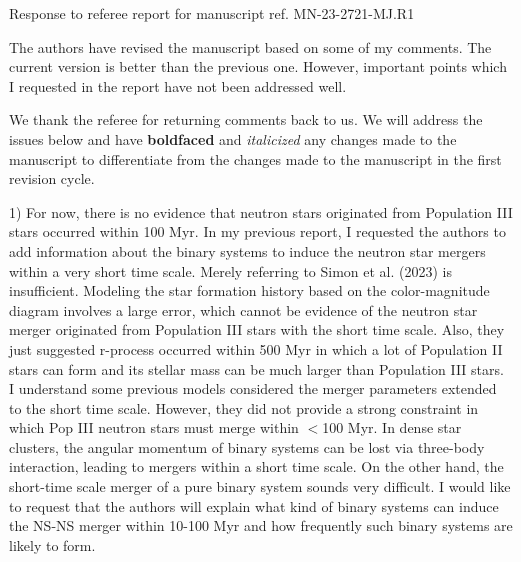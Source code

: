 \documentclass[11pt]{article}
\begin{document}
\begin{center} 
\bfseries{
\begin{large}
  Response to referee report for manuscript ref. MN-23-2721-MJ.R1
\end{large}
}
\end{center}

\begin{tcolorbox}[colback={lightgray}]
The authors have revised the manuscript based on some of my comments. The current version is better than the previous one. However, important points which I requested in the report have not been addressed well.
\end{tcolorbox}

We thank the referee for returning comments back to us. We will address the issues below and have \textbf{boldfaced} and \textit{italicized} any changes made to the manuscript to differentiate from the changes made to the manuscript in the first revision cycle.

\begin{tcolorbox}[colback={lightgray}]
1) For now, there is no evidence that neutron stars originated from Population III stars occurred within 100 Myr. In my previous report, I requested the authors to add information about the binary systems to induce the neutron star mergers within a very short time scale. Merely referring to Simon et al. (2023) is insufficient. Modeling the star formation history based on the color-magnitude diagram involves a large error, which cannot be evidence of the neutron star merger originated from Population III stars with the short time scale. Also, they just suggested r-process occurred within 500 Myr in which a lot of Population II stars can form and its stellar mass can be much larger than Population III stars. I understand some previous models considered the merger parameters extended to the short time scale. However, they did not provide a strong constraint in which Pop III neutron stars must merge within $<$100 Myr. In dense star clusters, the angular momentum of binary systems can be lost via three-body interaction, leading to mergers within a short time scale. On the other hand, the short-time scale merger of a pure binary system sounds very difficult. I would like to request that the authors will explain what kind of binary systems can induce the NS-NS merger within 10-100 Myr and how frequently such binary systems are likely to form.
\end{tcolorbox}
\end{document}
